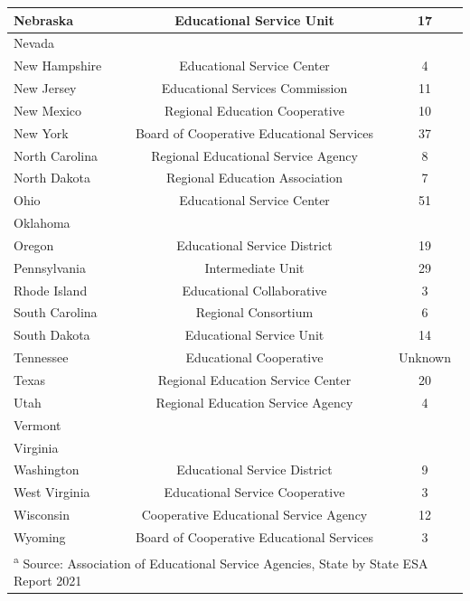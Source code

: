 \begin{table}
\begin{tabular}[t]{|l|c|c|}
\hline
Nebraska & Educational Service Unit & 17\\
\hline
Nevada &  & \\
\hline
New Hampshire & Educational Service Center & 4\\
\hline
New Jersey & Educational Services Commission & 11\\
\hline
New Mexico & Regional Education Cooperative & 10\\
\hline
New York & Board of Cooperative Educational Services & 37\\
\hline
North Carolina & Regional Educational Service Agency & 8\\
\hline
North Dakota & Regional Education Association & 7\\
\hline
Ohio & Educational Service Center & 51\\
\hline
Oklahoma &  & \\
\hline
Oregon & Educational Service District & 19\\
\hline
Pennsylvania & Intermediate Unit & 29\\
\hline
Rhode Island & Educational Collaborative & 3\\
\hline
South Carolina & Regional Consortium & 6\\
\hline
South Dakota & Educational Service Unit & 14\\
\hline
Tennessee & Educational Cooperative & Unknown\\
\hline
Texas & Regional Education Service Center & 20\\
\hline
Utah & Regional Education Service Agency & 4\\
\hline
Vermont &  & \\
\hline
Virginia &  & \\
\hline
Washington & Educational Service District & 9\\
\hline
West Virginia & Educational Service Cooperative & 3\\
\hline
Wisconsin & Cooperative Educational Service Agency & 12\\
\hline
Wyoming & Board of Cooperative Educational Services & 3\\
\hline
\multicolumn{3}{l}{\textsuperscript{a} Source: Association of Educational Service Agencies, State by State ESA Report 2021}\\
\end{tabular}
\end{table}
